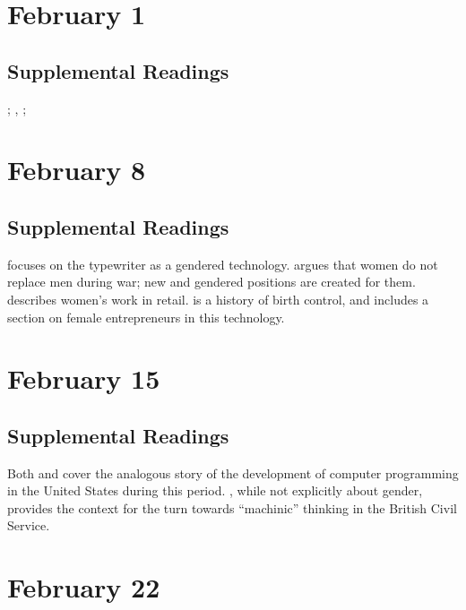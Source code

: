 \documentclass[11pt]{article}
\renewcommand{\cite}{\textcite}
\begin{document}
\section{February 1}


\subsection{Supplemental Readings}
\cite{Maines:1999uw}; \cite{Rossiter:1982vn}, \cite{Tichi:1987wb}; \cite{Hacker:1989tm}

\section{February 8}


\subsection{Supplemental Readings}

\cite{Davies:1982vb} focuses on the typewriter as a gendered technology.  \cite{Milkman:1987tl} argues that women do not replace men during war; new and gendered positions are created for them. \cite{Benson:1987wl} describes women's work in retail. \cite{Tone:2001to} is a history of birth control, and includes a section on female entrepreneurs in this technology.

\section{February 15}


\subsection{Supplemental Readings}

Both \cite{Ensmenger:2010te} and \cite{Abbate:2012wq} cover the analogous story of the development of computer programming in the United States during this period.  \cite{Agar:2003wf}, while not explicitly about gender, provides the context for the turn towards ``machinic'' thinking in the British Civil Service.


\section{February 22}
\end{document}

